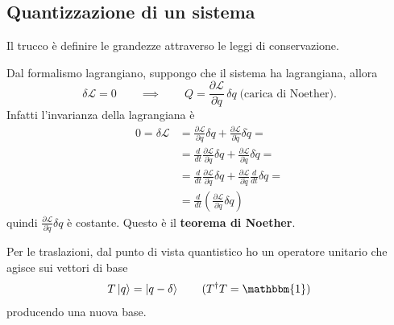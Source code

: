 \subsection{Quantizzazione di un sistema}
Il trucco è definire le grandezze attraverso le leggi di conservazione.

\bigskip
\noindent
Dal formalismo lagrangiano, suppongo che il sistema ha lagrangiana, allora
\[
\delta \mathcal{L} = 0 \qquad \implies \qquad Q = \frac{\partial \mathcal{L}}{\partial \dot{q}} \, \delta q \; \text{(carica di Noether).}
\]
Infatti l'invarianza della lagrangiana è
\begin{align*}
0 = \delta \mathcal{L} &= \frac{\partial \mathcal{L}}{\partial q} \delta q + \frac{\partial \mathcal{L}}{\partial \dot{q}} \delta \dot{q} = \\
&= \frac{d}{dt} \frac{\partial \mathcal{L}}{\partial \dot{q}} \delta q + \frac{\partial \mathcal{L}}{\partial \dot{q}} \delta \dot{q} = \\
&= \frac{d}{dt} \frac{\partial \mathcal{L}}{\partial \dot{q}} \delta q + \frac{\partial \mathcal{L}}{\partial \dot{q}} \frac{d}{dt} \delta q = \\
&= \frac{d}{dt} \left( \frac{\partial \mathcal{L}}{\partial \dot{q}} \delta q \right)
\end{align*}
quindi \( \frac{\partial \mathcal{L}}{\partial \dot{q}} \delta q \) è costante. Questo è il \textbf{teorema di Noether}.

\bigskip
\noindent
Per le traslazioni, dal punto di vista quantistico ho un operatore unitario che agisce sui vettori di base
\[
T \ket{q} = \ket{q - \delta} \qquad (T^\dag T = \mathbbm{1})
\]
producendo una nuova base.

